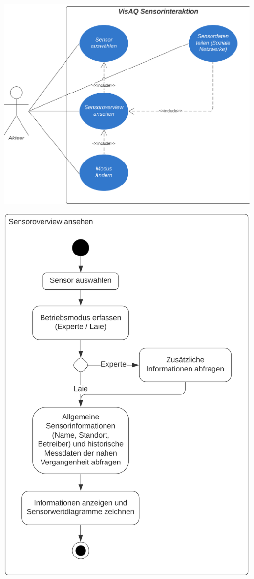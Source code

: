 \begin{center}
\includegraphics[scale=0.16]{media/activity-usage/Sensorinteraktion} 

\clearpage

\includegraphics[scale=0.19]{media/activity-usage/SensoroverviewAnsehen}
\end{center}